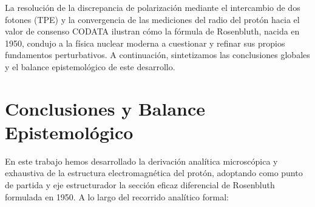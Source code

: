 \documentclass[10pt,a4paper]{article}
\begin{document}
La resolución de la discrepancia de polarización mediante el intercambio de dos fotones (TPE) y la convergencia de las mediciones del radio del protón hacia el valor de consenso CODATA ilustran cómo la fórmula de Rosenbluth, nacida en 1950, condujo a la física nuclear moderna a cuestionar y refinar sus propios fundamentos perturbativos. A continuación, sintetizamos las conclusiones globales y el balance epistemológico de este desarrollo.

\section{Conclusiones y Balance Epistemológico}
\label{sec:conclusiones}

En este trabajo hemos desarrollado la derivación analítica microscópica y exhaustiva de la estructura electromagnética del protón, adoptando como punto de partida y eje estructurador la sección eficaz diferencial de Rosenbluth formulada en 1950. A lo largo del recorrido analítico formal:
\end{document}
